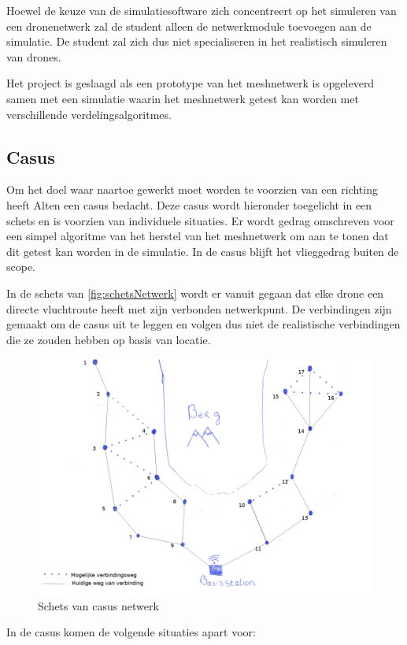 \documentclass[a4paper, 11pt, oneside]{report}
\begin{document}
Hoewel de keuze van de simulatiesoftware zich concentreert op het simuleren van een dronenetwerk zal de student alleen de netwerkmodule toevoegen aan de simulatie. 
De student zal zich dus niet specialiseren in het realistisch simuleren van drones.

Het project is geslaagd als een prototype van het meshnetwerk is opgeleverd samen met een simulatie waarin het meshnetwerk getest kan worden met verschillende verdelingsalgoritmes.

\subsection{Casus}
Om het doel waar naartoe gewerkt moet worden te voorzien van een richting heeft Alten een casus bedacht.
Deze casus wordt hieronder toegelicht in een schets en is voorzien van individuele situaties.
Er wordt gedrag omschreven voor een simpel algoritme van het herstel van het meshnetwerk om aan te tonen dat dit getest kan worden in de simulatie.
In de casus blijft het vlieggedrag buiten de scope.


In de schets van \autoref{fig:schetsNetwerk} wordt er vanuit gegaan dat elke drone een directe vluchtroute heeft met zijn verbonden netwerkpunt.
De verbindingen zijn gemaakt  om de casus uit te leggen en volgen dus niet de realistische verbindingen die ze zouden hebben op basis van locatie.
\begin{figure}[H]
	\begin{center}\includegraphics[width=0.61\linewidth]{schetsNetwerk}\end{center}
	\caption{Schets van casus netwerk}
	\label{fig:schetsNetwerk}
\end{figure}
In de casus komen de volgende situaties apart voor:
\end{document}
